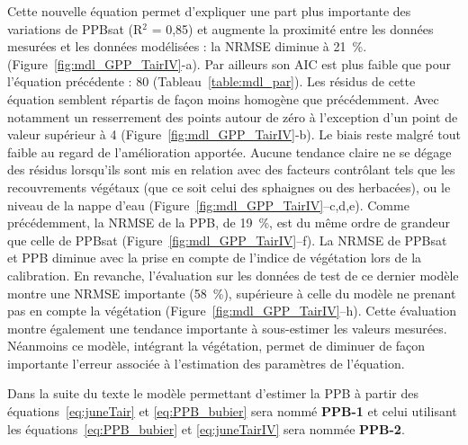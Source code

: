 Cette nouvelle équation permet d'expliquer une part plus importante des variations de PPBsat (R$^{2}$ = 0,85) et augmente la proximité entre les données mesurées et les données modélisées : la NRMSE diminue à \SI{21}{\percent}. (Figure~\ref{fig:mdl_GPP_TairIV}-a).
Par ailleurs son AIC est plus faible que pour l'équation précédente : 80 (Tableau~\ref{table:mdl_par}).
Les résidus de cette équation semblent répartis de façon moins homogène que précédemment.
Avec notamment un resserrement des points autour de zéro à l'exception d'un point de valeur supérieur à \num{4} (Figure~\ref{fig:mdl_GPP_TairIV}-b).
Le biais reste malgré tout faible au regard de l'amélioration apportée.
Aucune tendance claire ne se dégage des résidus lorsqu'ils sont mis en relation avec des facteurs contrôlant tels que les recouvrements végétaux (que ce soit celui des sphaignes ou des herbacées), ou le niveau de la nappe d'eau (Figure~\ref{fig:mdl_GPP_TairIV}--c,d,e).
Comme précédemment, la NRMSE de la PPB, de \SI{19}{\percent}, est du même ordre de grandeur que celle de PPBsat (Figure~\ref{fig:mdl_GPP_TairIV}--f).
La NRMSE de PPBsat et PPB diminue avec la prise en compte de l'indice de végétation lors de la calibration.
En revanche, l'évaluation sur les données de test de ce dernier modèle montre une NRMSE importante (\SI{58}{\percent}), supérieure à celle du modèle ne prenant pas en compte la végétation (Figure~\ref{fig:mdl_GPP_TairIV}--h).
Cette évaluation montre également une tendance importante à sous-estimer les valeurs mesurées.
Néanmoins ce modèle, intégrant la végétation, permet de diminuer de façon importante l'erreur associée à l'estimation des paramètres de l'équation.

Dans la suite du texte le modèle permettant d'estimer la PPB à partir des équations~\ref{eq:juneTair} et \ref{eq:PPB_bubier} sera nommé \textbf{PPB-1} et celui utilisant les équations~\ref{eq:PPB_bubier} et \ref{eq:juneTairIV} sera nommée \textbf{PPB-2}.


